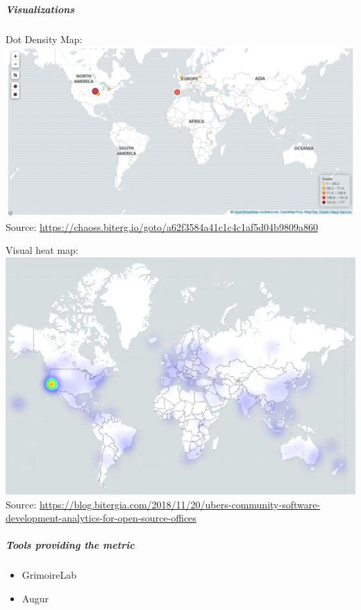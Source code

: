 \hypertarget{visualizations}{%
\subparagraph{Visualizations}\label{visualizations}}

Dot Density Map:
\includegraphics{images/contributor-location_dot-density-map.png}
Source:
\href{https://chaoss.biterg.io/goto/a62f3584a41c1c4c1af5d04b9809a860}{\url{https://chaoss.biterg.io/goto/a62f3584a41c1c4c1af5d04b9809a860}}

Visual heat map:
\includegraphics{images/contributor-location_heatmap.png} Source:
\href{https://blog.bitergia.com/2018/11/20/ubers-community-software-development-analytics-for-open-source-offices}{\url{https://blog.bitergia.com/2018/11/20/ubers-community-software-development-analytics-for-open-source-offices}}

\hypertarget{tools-providing-the-metric}{%
\subparagraph{Tools providing the
metric}\label{tools-providing-the-metric}}

\begin{itemize}
\tightlist
\item
  GrimoireLab
\item
  Augur
\end{itemize}

